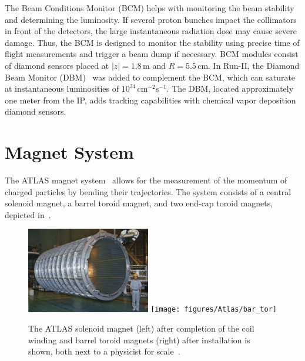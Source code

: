 The Beam Conditions Monitor (BCM) helps with monitoring the beam stability and determining the luminosity.  If several proton bunches impact the collimators in front of the detectors, the large instantaneous radiation dose may cause severe damage. Thus, the BCM is designed to monitor the stability using precise time of flight measurements and trigger a beam dump if necessary. BCM modules consist of diamond sensors placed at $|z|=1.8$\,m and $R=5.5$\,cm. In Run-II, the Diamond Beam Monitor (DBM)~\cite{DBM} was added to complement the BCM, which can saturate at instantaneous luminosities of $10^{34}$\,cm$^{-2}$s$^{-1}$. The DBM, located approximately one meter from the IP, adds tracking capabilities with chemical vapor deposition diamond sensors. 


\section{Magnet System}
The ATLAS magnet system~\cite{Magnet_TDR} allows for the measurement of the momentum of charged particles by bending their trajectories. The system consists of a central solenoid magnet, a barrel toroid magnet, and two end-cap toroid magnets, depicted in~\Fig{\ref{fig:mag_layout}}.

\begin{figure}[htbp]
\begin{center}
\includegraphics[width=0.48\textwidth]{figures/Atlas/sol_mag}
\texttt{[image: figures/Atlas/bar\_tor]}
\caption[Photo of ATLAS solenoid and barrel toroid magnets]{The ATLAS solenoid magnet (left) after completion of the coil winding and barrel toroid magnets (right) after installation is shown, both next to a physicist for scale~\cite{ATLAS}.}
\label{fig:mag_layout}
\end{center}
\end{figure}

